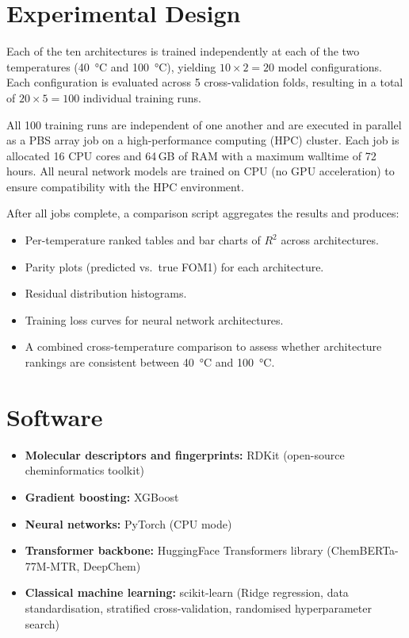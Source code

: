 \documentclass[11pt,a4paper]{article}
\begin{document}
\section{Experimental Design}

Each of the ten architectures is trained independently at each of the two temperatures (\SI{40}{\degreeCelsius} and \SI{100}{\degreeCelsius}), yielding $10 \times 2 = 20$ model configurations. Each configuration is evaluated across 5 cross-validation folds, resulting in a total of $20 \times 5 = 100$ individual training runs.

All 100 training runs are independent of one another and are executed in parallel as a PBS array job on a high-performance computing (HPC) cluster. Each job is allocated 16 CPU cores and 64\,GB of RAM with a maximum walltime of 72 hours. All neural network models are trained on CPU (no GPU acceleration) to ensure compatibility with the HPC environment.

After all jobs complete, a comparison script aggregates the results and produces:
\begin{itemize}
    \item Per-temperature ranked tables and bar charts of $R^2$ across architectures.
    \item Parity plots (predicted vs.\ true FOM1) for each architecture.
    \item Residual distribution histograms.
    \item Training loss curves for neural network architectures.
    \item A combined cross-temperature comparison to assess whether architecture rankings are consistent between \SI{40}{\degreeCelsius} and \SI{100}{\degreeCelsius}.
\end{itemize}

\section{Software}

\begin{itemize}
    \item \textbf{Molecular descriptors and fingerprints:} RDKit (open-source cheminformatics toolkit)
    \item \textbf{Gradient boosting:} XGBoost
    \item \textbf{Neural networks:} PyTorch (CPU mode)
    \item \textbf{Transformer backbone:} HuggingFace Transformers library (ChemBERTa-77M-MTR, DeepChem)
    \item \textbf{Classical machine learning:} scikit-learn (Ridge regression, data standardisation, stratified cross-validation, randomised hyperparameter search)
\end{itemize}
\end{document}
